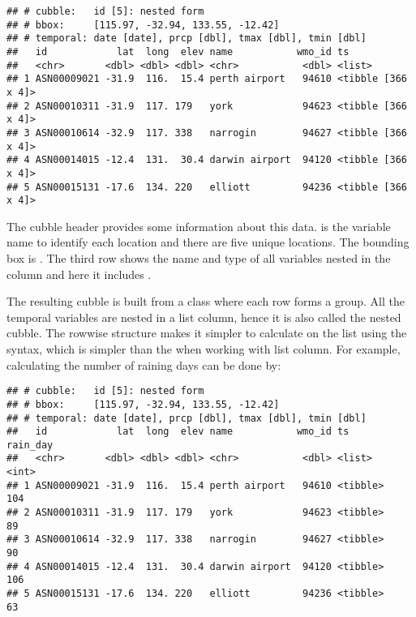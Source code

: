 \documentclass{article}
\newenvironment{Shaded}{\begin{snugshade}}{\end{snugshade}}
\newcommand{\AttributeTok}[1]{\textcolor[rgb]{0.77,0.63,0.00}{#1}}
\newcommand{\DecValTok}[1]{\textcolor[rgb]{0.00,0.00,0.81}{#1}}
\newcommand{\FunctionTok}[1]{\textcolor[rgb]{0.00,0.00,0.00}{#1}}
\newcommand{\NormalTok}[1]{#1}
\newcommand{\SpecialCharTok}[1]{\textcolor[rgb]{0.00,0.00,0.00}{#1}}
\begin{document}
\begin{verbatim}
## # cubble:   id [5]: nested form
## # bbox:     [115.97, -32.94, 133.55, -12.42]
## # temporal: date [date], prcp [dbl], tmax [dbl], tmin [dbl]
##   id            lat  long  elev name           wmo_id ts                
##   <chr>       <dbl> <dbl> <dbl> <chr>           <dbl> <list>            
## 1 ASN00009021 -31.9  116.  15.4 perth airport   94610 <tibble [366 x 4]>
## 2 ASN00010311 -31.9  117. 179   york            94623 <tibble [366 x 4]>
## 3 ASN00010614 -32.9  117. 338   narrogin        94627 <tibble [366 x 4]>
## 4 ASN00014015 -12.4  131.  30.4 darwin airport  94120 <tibble [366 x 4]>
## 5 ASN00015131 -17.6  134. 220   elliott         94236 <tibble [366 x 4]>
\end{verbatim}

The cubble header provides some information about this data.  is the variable name to identify each location and there are five unique locations. The bounding box is \code{[115.97, -32.94, 133.55, -12.42]}. The third row shows the name and type of all variables nested in the  column and here it includes .

The resulting cubble is built from a  class where each row forms a group. All the temporal variables are nested in a list column, hence it is also called the nested cubble. The rowwise structure makes it simpler to calculate on the list using the  syntax, which is simpler than the  when working with list column. For example, calculating the number of raining days can be done by:

\begin{Shaded}
\end{Shaded}

\begin{verbatim}
## # cubble:   id [5]: nested form
## # bbox:     [115.97, -32.94, 133.55, -12.42]
## # temporal: date [date], prcp [dbl], tmax [dbl], tmin [dbl]
##   id            lat  long  elev name           wmo_id ts       rain_day
##   <chr>       <dbl> <dbl> <dbl> <chr>           <dbl> <list>      <int>
## 1 ASN00009021 -31.9  116.  15.4 perth airport   94610 <tibble>      104
## 2 ASN00010311 -31.9  117. 179   york            94623 <tibble>       89
## 3 ASN00010614 -32.9  117. 338   narrogin        94627 <tibble>       90
## 4 ASN00014015 -12.4  131.  30.4 darwin airport  94120 <tibble>      106
## 5 ASN00015131 -17.6  134. 220   elliott         94236 <tibble>       63
\end{verbatim}
\end{document}
